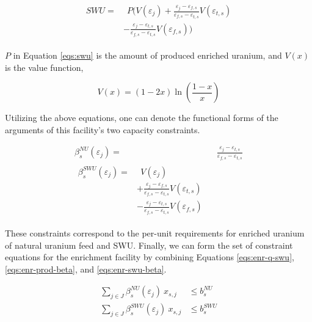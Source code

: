 \begin{align}
\begin{split}
\label{eqs:swu}
SWU = & \:\: P ( V(\varepsilon_{j}) 
      + \frac{\varepsilon_{j} - \varepsilon_{f,s}}
               {\varepsilon_{f,s} - \varepsilon_{t,s}} V(\varepsilon_{t,s}) \\
      & - \frac{\varepsilon_{j} - \varepsilon_{t,s}}
               {\varepsilon_{f,s} - \varepsilon_{t,s}} V(\varepsilon_{f,s}) )
\end{split}
\end{align}

$P$ in Equation \ref{eqs:swu} is the amount of produced enriched uranium, and
$V(x)$ is the value function,

\begin{equation}\label{eqs:value}
  V(x) = (1-2x) \ln \left(\frac{1-x}{x}\right)
\end{equation}

Utilizing the above equations, one can denote the functional forms of the
arguments of this facility's two capacity constraints.

\begin{align}
\label{eqs:enr-prod-beta}
\beta_{s}^{NU}(\varepsilon_{j}) = & \:\: \frac{\varepsilon_{j} - \varepsilon_{t,s}}
                                      {\varepsilon_{f,s} - \varepsilon_{t,s}} \\
\begin{split}
\label{eqs:enr-swu-beta}
\beta_{s}^{SWU}(\varepsilon_{j}) = & \:\: V(\varepsilon_{j}) \\
                         & + \frac{\varepsilon_{j} - \varepsilon_{f,s}}
                                  {\varepsilon_{f,s} - \varepsilon_{t,s}} V(\varepsilon_{t,s}) \\
                         & - \frac{\varepsilon_{j} - \varepsilon_{t,s}}
                                  {\varepsilon_{f,s} - \varepsilon_{t,s}} V(\varepsilon_{f,s})
\end{split}
\end{align}

These constraints correspond to the per-unit requirements for enriched uranium
of natural uranium feed and SWU. Finally, we can form the set of constraint
equations for the enrichment facility by combining Equations
\ref{eqs:enr-q-swu}, \ref{eqs:enr-prod-beta}, and \ref{eqs:enr-swu-beta}.

\begin{align}
\label{eqs:enr-prod-constr}
\sum_{j \in J}\beta_{s}^{NU}(\varepsilon_{j}) \: x_{s,j}  & \leq b_{s}^{NU} \\
\label{eqs:enr-swu-constr}
\sum_{j \in J}\beta_{s}^{SWU}(\varepsilon_{j}) \: x_{s,j} & \leq b_{s}^{SWU}
\end{align}

